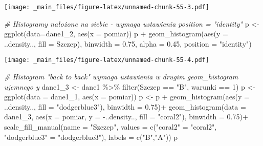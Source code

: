 \documentclass[
]{book}
\newenvironment{Shaded}{\begin{snugshade}}{\end{snugshade}}
\newcommand{\AttributeTok}[1]{\textcolor[rgb]{0.77,0.63,0.00}{#1}}
\newcommand{\CommentTok}[1]{\textcolor[rgb]{0.56,0.35,0.01}{\textit{#1}}}
\newcommand{\DecValTok}[1]{\textcolor[rgb]{0.00,0.00,0.81}{#1}}
\newcommand{\FloatTok}[1]{\textcolor[rgb]{0.00,0.00,0.81}{#1}}
\newcommand{\FunctionTok}[1]{\textcolor[rgb]{0.00,0.00,0.00}{#1}}
\newcommand{\NormalTok}[1]{#1}
\newcommand{\OtherTok}[1]{\textcolor[rgb]{0.56,0.35,0.01}{#1}}
\newcommand{\SpecialCharTok}[1]{\textcolor[rgb]{0.00,0.00,0.00}{#1}}
\newcommand{\StringTok}[1]{\textcolor[rgb]{0.31,0.60,0.02}{#1}}
\begin{document}
\texttt{[image: \_main\_files/figure-latex/unnamed-chunk-55-3.pdf]}

\begin{Shaded}
\begin{Highlighting}[]
\CommentTok{\# Histogramy nałożone na siebie {-} wymaga ustawienia position = "identity"}
\NormalTok{p }\OtherTok{\textless{}{-}} \FunctionTok{ggplot}\NormalTok{(}\AttributeTok{data=}\NormalTok{dane1\_2, }\FunctionTok{aes}\NormalTok{(}\AttributeTok{x =}\NormalTok{ pomiar))}
\NormalTok{p }\SpecialCharTok{+} \FunctionTok{geom\_histogram}\NormalTok{(}\FunctionTok{aes}\NormalTok{(}\AttributeTok{y =}\NormalTok{ ..density.., }\AttributeTok{fill =}\NormalTok{ Szczep), }\AttributeTok{binwidth =} \FloatTok{0.75}\NormalTok{, }\AttributeTok{alpha =} \FloatTok{0.45}\NormalTok{, }\AttributeTok{position =} \StringTok{"identity"}\NormalTok{)}
\end{Highlighting}
\end{Shaded}

\texttt{[image: \_main\_files/figure-latex/unnamed-chunk-55-4.pdf]}

\begin{Shaded}
\begin{Highlighting}[]
\CommentTok{\# Histogram "back to back" wymaga ustawienia w drugim geom\_histogram ujemnego y}
\NormalTok{dane1\_3 }\OtherTok{\textless{}{-}}\NormalTok{ dane1 }\SpecialCharTok{\%\textgreater{}\%} \FunctionTok{filter}\NormalTok{(Szczep }\SpecialCharTok{==} \StringTok{"B"}\NormalTok{, warunki }\SpecialCharTok{==} \DecValTok{1}\NormalTok{)}
\NormalTok{p }\OtherTok{\textless{}{-}} \FunctionTok{ggplot}\NormalTok{(}\AttributeTok{data =}\NormalTok{ dane1\_1, }\FunctionTok{aes}\NormalTok{(}\AttributeTok{x =}\NormalTok{ pomiar))}
\NormalTok{p }\OtherTok{\textless{}{-}}\NormalTok{ p }\SpecialCharTok{+} \FunctionTok{geom\_histogram}\NormalTok{(}\FunctionTok{aes}\NormalTok{(}\AttributeTok{y =}\NormalTok{ ..density.., }\AttributeTok{fill =} \StringTok{"dodgerblue3"}\NormalTok{), }\AttributeTok{binwidth =} \FloatTok{0.75}\NormalTok{)}\SpecialCharTok{+}
  \FunctionTok{geom\_histogram}\NormalTok{(}\AttributeTok{data =}\NormalTok{ dane1\_3, }\FunctionTok{aes}\NormalTok{(}\AttributeTok{x =}\NormalTok{ pomiar, }\AttributeTok{y =} \SpecialCharTok{{-}}\NormalTok{..density.., }\AttributeTok{fill =} \StringTok{"coral2"}\NormalTok{),}
                 \AttributeTok{binwidth =} \FloatTok{0.75}\NormalTok{)}\SpecialCharTok{+}
  \FunctionTok{scale\_fill\_manual}\NormalTok{(}\AttributeTok{name =} \StringTok{"Szczep"}\NormalTok{,}
                    \AttributeTok{values =} \FunctionTok{c}\NormalTok{(}\StringTok{"coral2"} \OtherTok{=} \StringTok{"coral2"}\NormalTok{, }\StringTok{"dodgerblue3"} \OtherTok{=} \StringTok{"dodgerblue3"}\NormalTok{), }
                    \AttributeTok{labels =} \FunctionTok{c}\NormalTok{(}\StringTok{"B"}\NormalTok{,}\StringTok{"A"}\NormalTok{))}
\NormalTok{p}
\end{Highlighting}
\end{Shaded}
\end{document}
